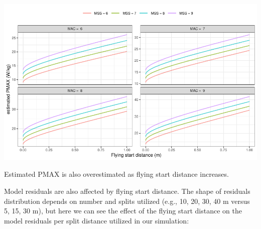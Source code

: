 \documentclass[fleqn,10pt,lineno]{wlpeerj} %
\begin{document}
\begin{center}\includegraphics[width=1\linewidth]{paper_files/figure-latex/unnamed-chunk-36-1} \end{center}

Estimated PMAX is also overestimated as flying start distance increases.

Model residuals are also affected by flying start distance. The shape of residuals distribution depends on number and splits utilized (e.g., 10, 20, 30, 40 m versus 5, 15, 30 m), but here we can see the effect of the flying start distance on the model residuals per split distance utilized in our simulation:
\end{document}
